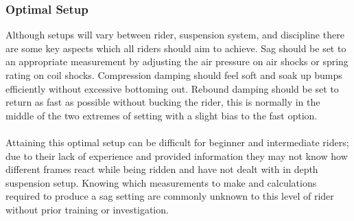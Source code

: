 	\subsubsection{Optimal Setup}
		Although setups will vary between rider, suspension system, and discipline there are some key aspects which all riders should aim to achieve. Sag should be set to an appropriate measurement by adjusting the air pressure on air \glspl{shock} or spring rating on coil \glspl{shock}. Compression damping should feel soft and soak up bumps efficiently without excessive bottoming out. Rebound damping should be set to return as fast as possible without bucking the rider, this is normally in the middle of the two extremes of setting with a slight bias to the fast option.
		\\\\
		Attaining this optimal setup can be difficult for beginner and intermediate riders; due to their lack of experience and provided information they may not know how different frames react while being ridden and have not dealt with in depth suspension setup. Knowing which measurements to make and calculations required to produce a sag setting are commonly unknown to this level of rider without prior training or investigation.